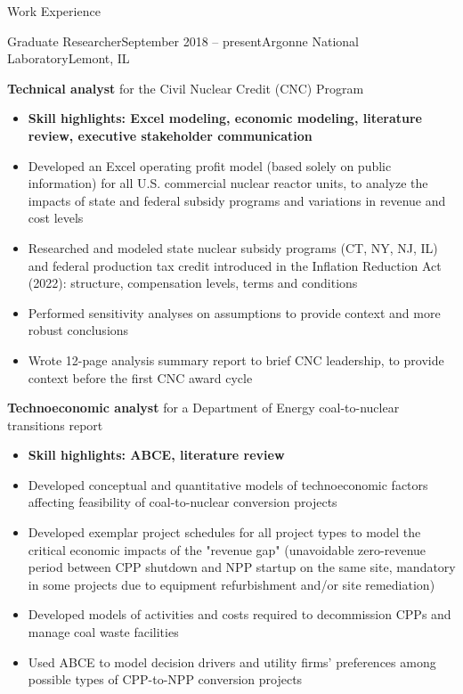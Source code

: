 \documentclass{resume} %
\begin{document}
\begin{rSection}{Work Experience}
\begin{rSubsection}{Graduate Researcher}{September 2018 -- present}{Argonne National Laboratory}{Lemont, IL}
  \item \textbf{Technical analyst} for the Civil Nuclear Credit (CNC) Program
  \begin{itemize}
    \setlength{\itemsep}{-3pt}
    \item \textbf{Skill highlights: Excel modeling, economic modeling, literature review, executive stakeholder communication}
    \item Developed an Excel operating profit model (based solely on public information) for all U.S. commercial nuclear reactor units, to analyze the impacts of state and federal subsidy programs and variations in revenue and cost levels
    \item Researched and modeled state nuclear subsidy programs (CT, NY, NJ, IL) and federal production tax credit introduced in the Inflation Reduction Act (2022): structure, compensation levels, terms and conditions
    \item Performed sensitivity analyses on assumptions to provide context and more robust conclusions
    \item Wrote 12-page analysis summary report to brief CNC leadership, to provide context before the first CNC award cycle
  \end{itemize}

  \item \textbf{Technoeconomic analyst} for a Department of Energy coal-to-nuclear transitions report
  \begin{itemize}
    \setlength{\itemsep}{-3pt}
    \item \textbf{Skill highlights: ABCE, literature review}
    \item Developed conceptual and quantitative models of technoeconomic factors affecting feasibility of coal-to-nuclear conversion projects
    \item Developed exemplar project schedules for all project types to model the critical economic impacts of the "revenue gap" (unavoidable zero-revenue period between CPP shutdown and NPP startup on the same site, mandatory in some projects due to equipment refurbishment and/or site remediation)
    \item Developed models of activities and costs required to decommission CPPs and manage coal waste facilities
    \item Used ABCE to model decision drivers and utility firms' preferences among possible types of CPP-to-NPP conversion projects
  \end{itemize}


\end{rSubsection}
\end{rSection}
\end{document}
